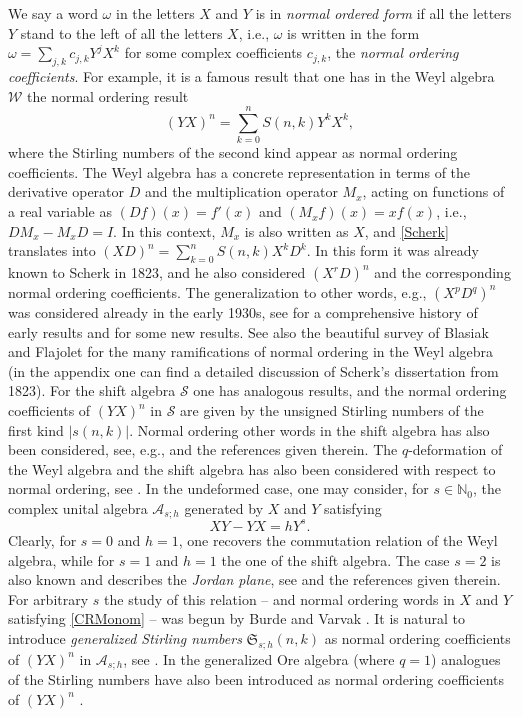 \documentclass[10pt]{amsart}
\begin{document}
We say a word $\omega$ in the letters $X$ and $Y$ is in {\it normal ordered form} if all the letters $Y$ stand to the left of all the letters $X$, i.e., $\omega$ is written in the form $\omega=\sum_{j,k}c_{j,k}Y^jX^k$ for some complex coefficients $c_{j,k}$, the {\em normal ordering coefficients}. For example, it is a famous result that one has in the Weyl algebra ${\mathcal W}$ the normal ordering result
 \begin{equation}\label{Scherk}
(YX)^n =\sum_{k=0}^n S(n,k) Y^kX^k,
\end{equation}
where the Stirling numbers of the second kind appear as normal ordering coefficients. The Weyl algebra has a concrete representation in terms of the derivative operator $D$ and the multiplication operator $M_x$, acting on functions of a real variable as $(Df)(x)=f'(x)$ and $(M_xf)(x)=xf(x)$, i.e., $DM_x-M_xD=I$. In this context, $M_x$ is also written as $X$, and \eqref{Scherk} translates into $(XD)^n =\sum_{k=0}^n S(n,k) X^kD^k$. In this form it was already known to Scherk in 1823, and he also considered $(X^rD)^n$ and the corresponding normal ordering coefficients. The generalization to other words, e.g., $(X^pD^q)^n$ was considered already in the early 1930s, see \cite{TMMS2016} for a comprehensive history of early results and \cite{BRLO2020} for some new results. See also the beautiful survey of Blasiak and Flajolet \cite{BLFL2011} for the many ramifications of normal ordering in the Weyl algebra (in the appendix one can find a detailed discussion of Scherk's dissertation from 1823). For the shift algebra  ${\mathcal S}$ one has analogous results, and the normal ordering coefficients of $(YX)^n$ in ${\mathcal S}$ are given by the unsigned Stirling numbers of the first kind $|s(n,k)|$. Normal ordering other words in the shift algebra has also been considered, see, e.g., \cite{MS2022} and the references given therein. The $q$-deformation of the Weyl algebra and the shift algebra has also been considered with respect to normal ordering, see \cite{TMMS2016}. In the undeformed case, one may consider, for $s\in \mathbb{N}_0$, the complex unital algebra $\mathcal{A}_{s;h}$ generated by $X$ and $Y$ satisfying
\begin{equation}\label{CRMonom}
XY-YX=hY^s.
\end{equation}
Clearly, for $s=0$ and $h=1$, one recovers the commutation relation of the Weyl algebra, while for $s=1$ and $h=1$ the one of the shift algebra. The case $s=2$ is also known and describes the {\em Jordan plane}, see \cite{TMMS2016} and the references given therein. For arbitrary $s$ the study of this relation -- and normal ordering words in $X$ and $Y$ satisfying \eqref{CRMonom} -- was begun by Burde \cite{Burde2005} and Varvak \cite{AV2005}. It is natural to introduce {\em generalized Stirling numbers} ${\mathfrak S}_{s;h}(n,k)$ as normal ordering coefficients of $(YX)^n$ in $\mathcal{A}_{s;h}$, see \cite{TMMSMS2011,TMMSMS2012}. In the generalized Ore algebra (where $q=1$) analogues of the Stirling numbers have also been introduced as normal ordering coefficients of $(YX)^n$ \cite{TMMS2023}.
\end{document}
